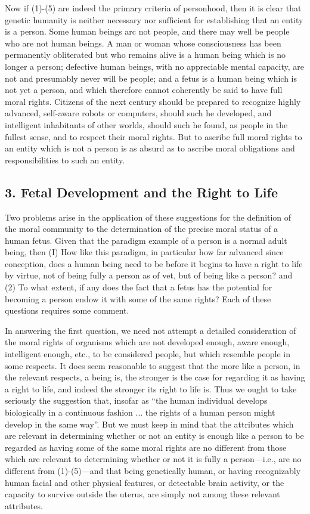 Now if (1)-(5) are indeed the primary criteria of
personhood, then it is clear that genetic humanity is
neither necessary nor sufficient for establishing that an
entity is a person. Some human beings arc not people, and
there may well be people who are not human beings. A
man or woman whose consciousness has been
permanently obliterated but who remains alive is a human
being which is no longer a person; defective human
beings, with no appreciable mental capacity, are not and
presumably never will be people; and a fetus is a human
being which is not yet a person, and which therefore
cannot coherently be said to have full moral rights.
Citizens of the next century should be prepared to
recognize highly advanced, self-aware robots or
computers, should such he developed, and intelligent
inhabitants of other worlds, should such he found, as
people in the fullest sense, and to respect their moral
rights. But to ascribe full moral rights to an entity which
is not a person is as absurd as to ascribe moral obligations
and responsibilities to such an entity.

\subsection{3. Fetal Development and the Right to Life}

Two problems arise in the application of these
suggestions for the definition of the moral community to
the determination of the precise moral status of a human
fetus. Given that the paradigm example of a person is a
normal adult being, then (I) How like this paradigm, in
particular how far advanced since conception, does a
human being need to be before it begins to have a right to
life by virtue, not of being fully a person as of vet, but of
being like a person? and (2) To what extent, if any does
the fact that a fetus has the potential for becoming a
person endow it with some of the same rights? Each of
these questions requires some comment.

In answering the first question, we need not attempt a
detailed consideration of the moral rights of organisms
which are not developed enough, aware enough,
intelligent enough, etc., to be considered people, but
which resemble people in some respects. It does seem
reasonable to suggest that the more like a person, in the
relevant respects, a being is, the stronger is the case for
regarding it as having a right to life, and indeed the
stronger its right to life is. Thus we ought to take seriously
the suggestion that, insofar as ``the human individual
develops biologically in a continuous fashion ... the rights
of a human person might develop in the same way”. \autocite[p. 677-78]{Hayes1} But
we must keep in mind that the attributes which are
relevant in determining whether or not an entity is enough
like a person to be regarded as having some of the same
moral rights are no different from those which are
relevant to determining whether or not it is fully a
person—i.e., are no different from (1)-(5)—and that being
genetically human, or having recognizably human facial
and other physical features, or detectable brain activity, or
the capacity to survive outside the uterus, are simply not
among these relevant attributes.

